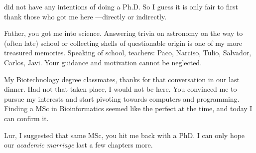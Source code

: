 
 did not have any intentions of doing a Ph.D. So I guess it is only fair to first thank those who got me here ---directly or indirectly.

Father, you got me into science. Answering trivia on astronomy on the way to (often late) school or collecting shells of questionable origin is one of my more treasured memories. Speaking of school, teachers: Paco, Narciso, Tulio, Salvador, Carlos, Javi. Your guidance and motivation cannot be neglected.

My Biotechnology degree classmates, thanks for that conversation in our last dinner. Had not that taken place, I would not be here. You convinced me to pursue my interests and start pivoting towards computers and programming. Finding a MSc in Bioinformatics seemed like the perfect at the time, and today I can confirm it. 

Lur, I suggested that same MSc, you hit me back with a PhD. I can only hope our \textit{academic marriage} last a few chapters more.
